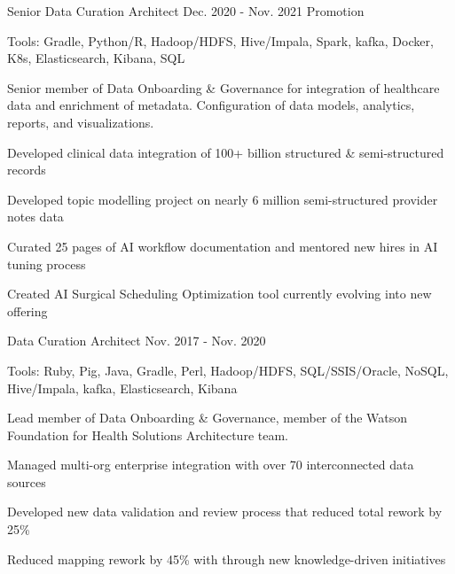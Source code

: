 \begin{cventries}
  \cvexpsubposition
    {Senior Data Curation Architect} %
    {Dec. 2020 - Nov. 2021} %
    {Promotion}
    {
      \begin{cvheavyparagraph}
        Tools: Gradle, Python/R, Hadoop/HDFS, Hive/Impala, Spark, kafka, Docker, K8s, Elasticsearch, Kibana, SQL
      \end{cvheavyparagraph}
    }
    {
      \begin{cvparagraph}
        Senior member of Data Onboarding \& Governance for integration of healthcare data and enrichment of metadata. Configuration of data models, analytics, reports, and visualizations.
      \end{cvparagraph}
      \begin{cvitems} %
        \item {Developed clinical data integration of 100+ billion structured \& semi-structured records}
        \item {Developed topic modelling project on nearly 6 million semi-structured provider notes data}
        \item {Curated 25 pages of AI workflow documentation and mentored new hires in AI tuning process}
        \item {Created AI Surgical Scheduling Optimization tool currently evolving into new offering}
      \end{cvitems}
    }

  \cvexpsubposition
    { Data Curation Architect} %
    {Nov. 2017 - Nov. 2020} %
    {}
    {
      \begin{cvheavyparagraph}
        Tools: Ruby, Pig, Java, Gradle, Perl, Hadoop/HDFS, SQL/SSIS/Oracle, NoSQL, Hive/Impala, kafka, Elasticsearch, Kibana
      \end{cvheavyparagraph}
    }
    {
      \begin{cvparagraph}
        Lead member of Data Onboarding \& Governance, member of the Watson Foundation for Health Solutions Architecture team. 
      \end{cvparagraph}
      \begin{cvitems} %
        \item {Managed multi-org enterprise integration with over 70 interconnected data sources}
        \item {Developed new data validation and review process that reduced total rework by 25\%}
        \item {Reduced mapping rework by 45\% with through new knowledge-driven initiatives}
      \end{cvitems}
    }


\end{cventries}
